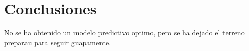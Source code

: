 \cleardoublepage

\chapter{Conclusiones}
\label{makereference8}

No se ha obtenido un modelo predictivo optimo, pero se ha dejado el terreno preparau para seguir guapamente.